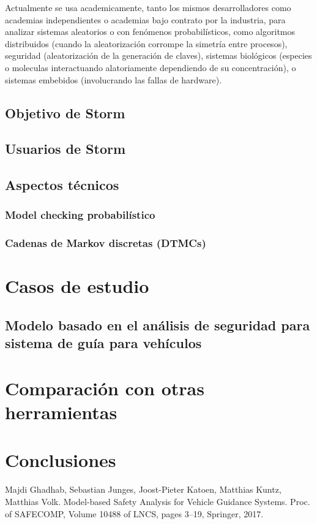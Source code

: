 \documentclass[11pt]{article}
\begin{document}
Actualmente se usa academicamente, tanto los mismos desarrolladores como academias independientes o academias bajo contrato por la industria, para analizar sistemas aleatorios o con fen\'omenos probabil\'isticos, como algoritmos distribuidos (cuando la aleatorizaci\'on corrompe la simetr\'ia entre procesos), seguridad (aleatorizaci\'on de la generaci\'on de claves), sistemas biol\'ogicos (especies o moleculas interactuando alatoriamente dependiendo de su concentraci\'on), o sistemas embebidos (involucrando las fallas de hardware). 

\subsection{Objetivo de Storm}

\subsection{Usuarios de Storm}

\subsection{Aspectos t\'ecnicos}

\subsubsection{Model checking probabil\'istico}

\subsubsection{Cadenas de Markov discretas (DTMCs)}

\section{Casos de estudio}

\subsection{Modelo basado en el an\'alisis de seguridad para sistema de gu\'ia para veh\'iculos}

\section{Comparaci\'on con otras herramientas}

\section{Conclusiones}

\begin{thebibliography}{99}
	 Majdi Ghadhab, Sebastian Junges, Joost-Pieter Katoen, Matthias Kuntz, Matthias Volk. Model-based Safety Analysis for Vehicle Guidance Systems. Proc. of SAFECOMP, Volume 10488 of LNCS, pages 3–19, Springer, 2017.
\end{thebibliography}
\end{document}
